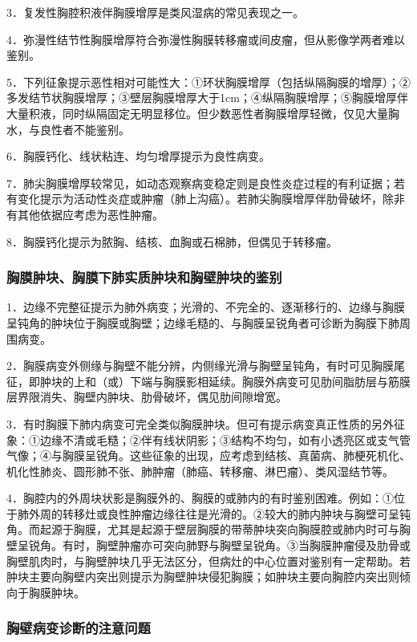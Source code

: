3．复发性胸腔积液伴胸膜增厚是类风湿病的常见表现之一。

4．弥漫性结节性胸膜增厚符合弥漫性胸膜转移瘤或间皮瘤，但从影像学两者难以鉴别。

5．下列征象提示恶性相对可能性大：①环状胸膜增厚（包括纵隔胸膜的增厚）；②多发结节状胸膜增厚；③壁层胸膜增厚大于1cm；④纵隔胸膜增厚；⑤胸膜增厚伴大量积液，同时纵隔固定无明显移位。但少数恶性者胸膜增厚轻微，仅见大量胸水，与良性者不能鉴别。

6．胸膜钙化、线状粘连、均匀增厚提示为良性病变。

7．肺尖胸膜增厚较常见，如动态观察病变稳定则是良性炎症过程的有利证据；若有变化提示为活动性炎症或肿瘤（肺上沟癌）。若肺尖胸膜增厚伴肋骨破坏，除非有其他依据应考虑为恶性肿瘤。

8．胸膜钙化提示为脓胸、结核、血胸或石棉肺，但偶见于转移瘤。

\subsubsection{胸膜肿块、胸膜下肺实质肿块和胸壁肿块的鉴别}

1．边缘不完整征提示为肺外病变；光滑的、不完全的、逐渐移行的、边缘与胸膜呈钝角的肿块位于胸膜或胸壁；边缘毛糙的、与胸膜呈锐角者可诊断为胸膜下肺周围病变。

2．胸膜病变外侧缘与胸壁不能分辨，内侧缘光滑与胸壁呈钝角，有时可见胸膜尾征，即肿块的上和（或）下端与胸膜影相延续。胸膜外病变可见肋间脂肪层与筋膜层界限消失、胸壁内肿块、肋骨破坏，偶见肋间隙增宽。

3．有时胸膜下肺内病变可完全类似胸膜肿块。但可有提示病变真正性质的另外征象：①边缘不清或毛糙；②伴有线状阴影；③结构不均匀，如有小透亮区或支气管气像；④与胸膜呈锐角。这些征象的出现，应考虑到结核、真菌病、肺梗死机化、机化性肺炎、圆形肺不张、肺肿瘤（肺癌、转移瘤、淋巴瘤）、类风湿结节等。

4．胸腔内的外周块状影是胸膜外的、胸膜的或肺内的有时鉴别困难。例如：①位于肺外周的转移灶或良性肿瘤边缘往往是光滑的。②较大的肺内肿块与胸壁可呈钝角。而起源于胸膜，尤其是起源于壁层胸膜的带蒂肿块突向胸膜腔或肺内时可与胸壁呈锐角。有时，胸壁肿瘤亦可突向肺野与胸壁呈锐角。③当胸膜肿瘤侵及肋骨或胸壁肌肉时，与胸壁肿块几乎无法区分，但病灶的中心位置对鉴别有一定帮助。若肿块主要向胸壁内突出则提示为胸壁肿块侵犯胸膜；如肿块主要向胸腔内突出则倾向于胸膜肿块。

\subsubsection{胸壁病变诊断的注意问题}

